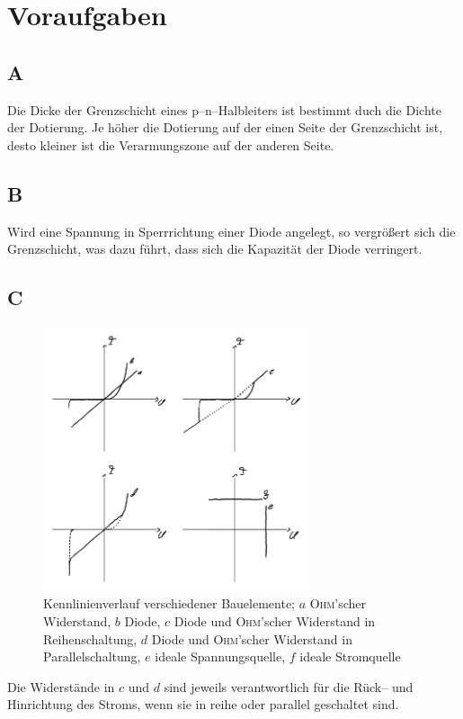 \documentclass[a4paper,10pt]{article}
\numberwithin{equation}{section}
\begin{document}
\clearpage
\section{Voraufgaben}
\subsection{A}
Die Dicke der Grenzschicht eines p--n--Halbleiters ist bestimmt duch die Dichte der Dotierung.
Je höher die Dotierung auf der einen Seite der Grenzschicht ist, desto kleiner ist die Verarmungszone auf der anderen Seite.

\subsection{B}
Wird eine Spannung in Sperrrichtung einer Diode angelegt, so vergrößert sich die Grenzschicht, was dazu führt, dass sich die Kapazität der Diode verringert.

\subsection{C}
\begin{figure}[h]
	\centering
	\includegraphics[width=0.7\textwidth]{C_crop.pdf}
	\caption[Kennlinienverlauf verschiedener Bauelemente]{Kennlinienverlauf verschiedener Bauelemente; $a$ \textsc{Ohm}'scher Widerstand, $b$ Diode, $c$ Diode und \textsc{Ohm}'scher Widerstand in Reihenschaltung, $d$ Diode und \textsc{Ohm}'scher Widerstand in Parallelschaltung, $e$ ideale Spannungsquelle, $f$ ideale Stromquelle}
\end{figure}
\noindent Die Widerstände in $c$ und $d$ sind jeweils verantwortlich für die Rück-- und Hinrichtung des Stroms, wenn sie in reihe oder parallel geschaltet sind.
\end{document}
